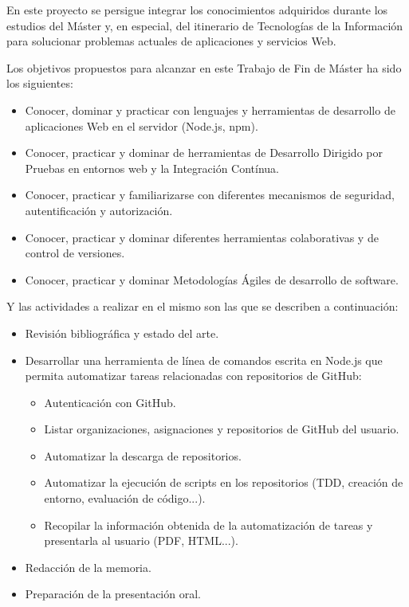 En este proyecto se persigue integrar los conocimientos adquiridos durante los estudios del Máster y,
en especial, del itinerario de Tecnologías de la Información para solucionar problemas actuales de aplicaciones y servicios Web.

Los objetivos propuestos para alcanzar en este Trabajo de Fin de Máster ha sido los siguientes:
\begin{itemize}
  \item Conocer, dominar y practicar con lenguajes y herramientas de desarrollo de aplicaciones Web
    en el servidor (Node.js, npm).
  \item Conocer, practicar y dominar de herramientas de Desarrollo Dirigido por Pruebas en entornos
web y la Integración Contínua.
  \item Conocer, practicar y familiarizarse con diferentes mecanismos de seguridad, autentificación
y autorización.
  \item Conocer, practicar y dominar diferentes herramientas colaborativas y de control de versiones.
  \item Conocer, practicar y dominar Metodologías Ágiles de desarrollo de software.
\end{itemize}
\bigskip

Y las actividades a realizar en el mismo son las que se describen a continuación:
\begin{itemize}
  \item Revisión bibliográfica y estado del arte.
  \item Desarrollar una herramienta de línea de comandos escrita en Node.js que permita automatizar tareas relacionadas con repositorios de GitHub:
  \begin{itemize}
    \item Autenticación con GitHub.
    \item Listar organizaciones, asignaciones y repositorios de GitHub del usuario.
    \item Automatizar la descarga de repositorios.
    \item Automatizar la ejecución de scripts en los repositorios (TDD, creación de entorno, evaluación de código...).
    \item Recopilar la información obtenida de la automatización de tareas y presentarla al usuario (PDF, HTML...).
  \end{itemize}
  \item Redacción de la memoria.
  \item Preparación de la presentación oral.
\end{itemize}

